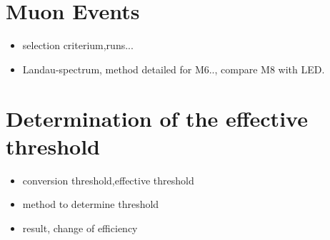 \section{Muon Events}

\begin{itemize}
  \item selection criterium,runs...
  \item Landau-spectrum, method detailed for M6..,   compare M8 with LED.
\end{itemize}






\section{Determination of the effective threshold}


\begin{itemize}
  \item conversion threshold,effective threshold
  \item method to determine threshold
  \item result, change of efficiency
\end{itemize}

